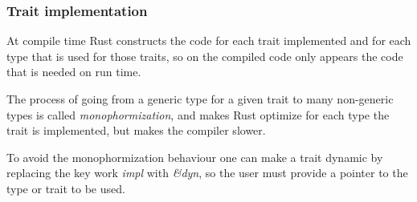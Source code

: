 \subsubsection{Trait implementation}

At compile time Rust constructs the code for each trait implemented and for each type that is used for those traits,
so on the compiled code only appears the code that is needed on run time.

The process of going from a generic type for a given trait to many non-generic types is called \textit{monophormization},
and makes Rust optimize for each type the trait is implemented, but makes the compiler slower.

To avoid the monophormization behaviour one can make a trait dynamic by replacing the key work \textit{impl} with \textit{\&dyn},
so the user must provide a pointer to the type or trait to be used.